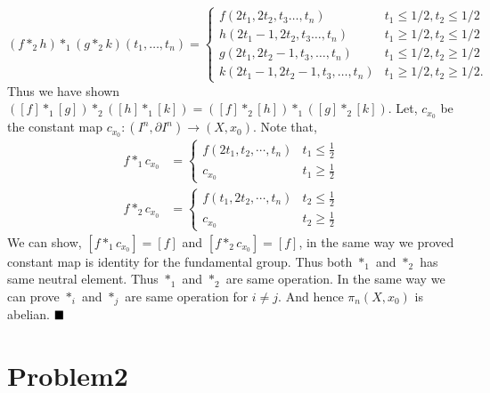 \documentclass[11pt]{article}
\newcommand{\p}{\partial}
\begin{document}
\begin{itemize}
$$
(f\ast_2 h) \ast_1 (g\ast_2 k)\left(t_{1}, \ldots, t_{n}\right)= \begin{cases}f\left(2 t_{1}, 2 t_{2}, t_{3} \ldots, t_{n}\right) & t_{1} \leq 1 / 2, t_{2} \leq 1 / 2 \\ h\left(2 t_{1}-1,2 t_{2}, t_{3} \ldots, t_{n}\right) & t_{1} \geq 1 / 2, t_{2} \leq 1 / 2 \\ g\left(2 t_{1}, 2 t_{2}-1, t_{3}, \ldots, t_{n}\right) & t_{1} \leq 1 / 2, t_{2} \geq 1 / 2 \\ k\left(2 t_{1}-1,2 t_{2}-1, t_{3}, \ldots, t_{n}\right) & t_{1} \geq 1 / 2, t_{2} \geq 1 / 2 .\end{cases}
$$
    Thus we have shown $([f] \ast_1 [g])\ast_2([h] \ast_1 [k])=([f]\ast_2[h]) \ast_1 ([g]\ast_2[k])$. Let, $c_{x_0}$ be the constant map $c_{x_0}:(I^n,\p I^n) \to (X,x_0)$. Note that,
     \begin{align*}
        f\ast_1  c_{x_0} &= \begin{cases}
            f(2t_1,t_2,\cdots,t_n) & t_1 \leq \frac{1}{2}\\
            c_{x_0} & t_1 \geq \frac{1}{2}
        \end{cases} \\
        f\ast_2  c_{x_0} &= \begin{cases}
            f(t_1,2t_2,\cdots,t_n) & t_2 \leq \frac{1}{2}\\
            c_{x_0} & t_2 \geq \frac{1}{2}
        \end{cases} 
    \end{align*}
    We can show, $[f\ast_1  c_{x_0}]=[f]$ and $[f\ast_2  c_{x_0}] = [f]$, in the same way we proved constant map is identity for the fundamental group. Thus both $\ast_1$ and $\ast_2$ has same neutral element. Thus $\ast_1$ and $\ast_2$ are same operation. In the same way we can prove $\ast_i$ and $\ast_j$ are same operation for $i \neq j$. And hence $\pi_n(X,x_0)$ is abelian. $\hfill \blacksquare$
 \end{itemize}
 

\section{Problem2}
\end{document}
